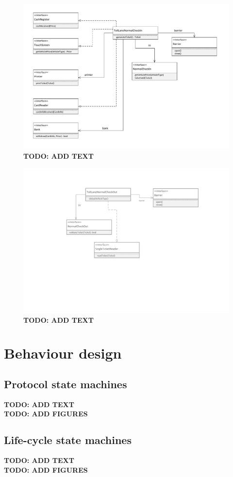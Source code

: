 \begin{figure}
\centerline{\includegraphics[width=\textwidth]{img/class_diagrams/class_diagram_toll_lane_normal_check_in}}
\caption{\textbf{TODO: ADD TEXT}}
\label{fig:cld_tlni}
\end{figure}

\begin{figure}
\centerline{\includegraphics[width=\textwidth]{img/class_diagrams/class_diagram_toll_lane_normal_check_out}}
\caption{\textbf{TODO: ADD TEXT}}
\label{fig:cld_tlno}
\end{figure}

\section{Behaviour design}
\subsection{Protocol state machines}
\textbf{TODO: ADD TEXT}\\
\textbf{TODO: ADD FIGURES}

\subsection{Life-cycle state machines}
\textbf{TODO: ADD TEXT}\\
\textbf{TODO: ADD FIGURES}